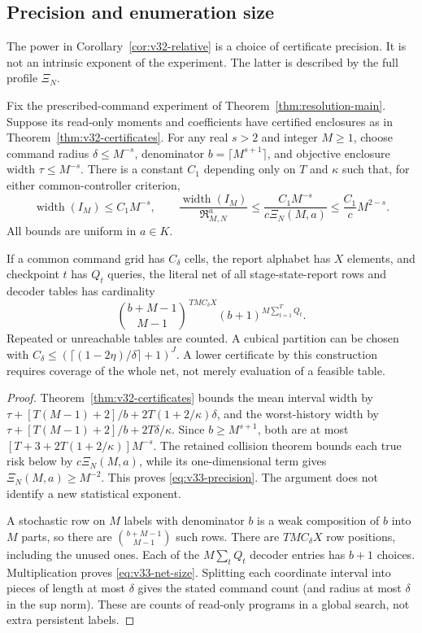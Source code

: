
\subsection{Precision and enumeration size}
The power in Corollary~\ref{cor:v32-relative} is a choice of
certificate precision. It is not an intrinsic exponent of the experiment.
The latter is described by the full profile $\Xi_N$.

\begin{theorem}
\label{thm:v33-precision}
Fix the prescribed-command experiment of
Theorem~\ref{thm:resolution-main}. Suppose its read-only moments and
coefficients have certified enclosures as in
Theorem~\ref{thm:v32-certificates}. For any real $s>2$ and integer
$M\ge1$, choose command radius $\delta\le M^{-s}$, denominator
$b=\lceil M^{s+1}\rceil$, and objective enclosure width
$\tau\le M^{-s}$. There is a constant $C_1$ depending only on $T$
and $\kappa$ such that, for either common-controller criterion,
\begin{equation}\label{eq:v33-precision}
 \operatorname{width}(I_M)\le C_1M^{-s},\qquad
 \frac{\operatorname{width}(I_M)}{\mathfrak R_{M,N}^{a}}
 \le\frac{C_1M^{-s}}{c\Xi_N(M,a)}
 \le\frac{C_1}{c}M^{2-s}.
\end{equation}
All bounds are uniform in $a\in K$.

If a common command grid has $C_\delta$ cells, the report alphabet
has $X$ elements, and checkpoint $t$ has $Q_t$ queries, the literal
net of all stage-state-report rows and decoder tables has cardinality
\begin{equation}\label{eq:v33-net-size}
 \binom{b+M-1}{M-1}^{\,TM C_\delta X}
                (b+1)^{M\sum_{t=1}^T Q_t}.
\end{equation}
Repeated or unreachable tables are counted. A cubical partition can
be chosen with
$C_\delta\le(\lceil(1-2\eta)/\delta\rceil+1)^J$.
A lower certificate by this construction requires coverage of the
whole net, not merely evaluation of a feasible table.
\end{theorem}
\begin{proof}
Theorem~\ref{thm:v32-certificates} bounds the mean interval width by
$\tau+[T(M-1)+2]/b+2T(1+2/\kappa)\delta$, and the worst-history
width by $\tau+[T(M-1)+2]/b+2T\delta/\kappa$. Since $b\ge M^{s+1}$,
both are at most
$[T+3+2T(1+2/\kappa)]M^{-s}$. The retained collision theorem bounds
each true risk below by $c\Xi_N(M,a)$, while its one-dimensional term
gives $\Xi_N(M,a)\ge M^{-2}$. This proves \eqref{eq:v33-precision}.
The argument does not identify a new statistical exponent.

A stochastic row on $M$ labels with denominator $b$ is a weak
composition of $b$ into $M$ parts, so there are
$\binom{b+M-1}{M-1}$ such rows. There are $TM C_\delta X$ row
positions, including the unused ones. Each of the $M\sum_t Q_t$
decoder entries has $b+1$ choices. Multiplication proves
\eqref{eq:v33-net-size}. Splitting each coordinate interval into
pieces of length at most $\delta$ gives the stated command count
(and radius at most $\delta$ in the sup norm). These are counts of
read-only programs in a global search, not extra persistent labels.
\end{proof}


